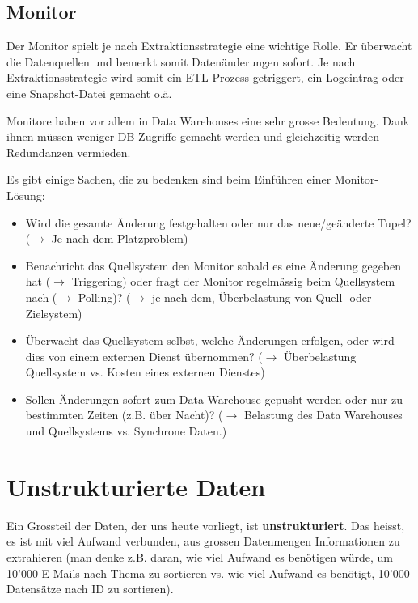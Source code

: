 \documentclass[a4paper, 11pt, nofootinbib]{article}
\begin{document}
\subsection{Monitor}
Der Monitor spielt je nach Extraktionsstrategie eine wichtige Rolle. Er überwacht die Datenquellen und bemerkt somit Datenänderungen sofort. Je nach Extraktionsstrategie wird somit ein ETL-Prozess getriggert, ein Logeintrag oder eine Snapshot-Datei gemacht o.ä. 

Monitore haben vor allem in Data Warehouses eine sehr grosse Bedeutung. Dank ihnen müssen weniger DB-Zugriffe gemacht werden und gleichzeitig werden Redundanzen vermieden.

\vspace{10px}

\noindent Es gibt einige Sachen, die zu bedenken sind beim Einführen einer Monitor-Lösung:
\begin{itemize}
	\item Wird die gesamte Änderung festgehalten oder nur das neue/geänderte Tupel? ($\rightarrow$ Je nach dem Platzproblem)
	\item Benachricht das Quellsystem den Monitor sobald es eine Änderung gegeben hat ($\rightarrow$ Triggering) oder fragt der Monitor regelmässig beim Quellsystem nach ($\rightarrow$ Polling)? ($\rightarrow$ je nach dem, Überbelastung von Quell- oder Zielsystem)
	\item Überwacht das Quellsystem selbst, welche Änderungen erfolgen, oder wird dies von einem externen Dienst übernommen? ($\rightarrow$ Überbelastung Quellsystem vs. Kosten eines externen Dienstes)
	\item Sollen Änderungen sofort zum Data Warehouse gepusht werden oder nur zu bestimmten Zeiten (z.B. über Nacht)? ($\rightarrow$ Belastung des Data Warehouses und Quellsystems vs. Synchrone Daten.)
	
\end{itemize}

\newpage

\section{Unstrukturierte Daten}
Ein Grossteil der Daten, der uns heute vorliegt, ist \textbf{unstrukturiert}. Das heisst, es ist mit viel Aufwand verbunden, aus grossen Datenmengen Informationen zu extrahieren (man denke z.B. daran, wie viel Aufwand es benötigen würde, um 10'000 E-Mails nach Thema zu sortieren vs. wie viel Aufwand es benötigt, 10'000 Datensätze nach ID zu sortieren).
\end{document}

